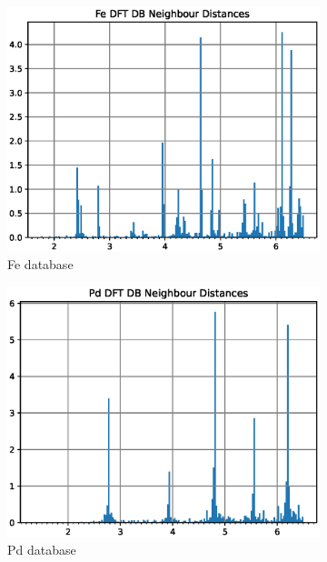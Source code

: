 \begin{figure}
\begin{subfigure}{.49\textwidth}
  \centering
  \includegraphics[width=.99\linewidth]{chapters/potentials_fe_pd_ru/neighbour_distances/db_fe_neighbours.eps}  
  \caption{Fe database}
  \label{fig:fedb}
\end{subfigure}
\begin{subfigure}{.49\textwidth}
  \centering
  \includegraphics[width=.99\linewidth]{chapters/potentials_fe_pd_ru/neighbour_distances/db_pd_neighbours.eps}  
  \caption{Pd database}
  \label{fig:pddb}
\end{subfigure}
\begin{subfigure}{.49\textwidth}

\end{subfigure}
\end{figure}
